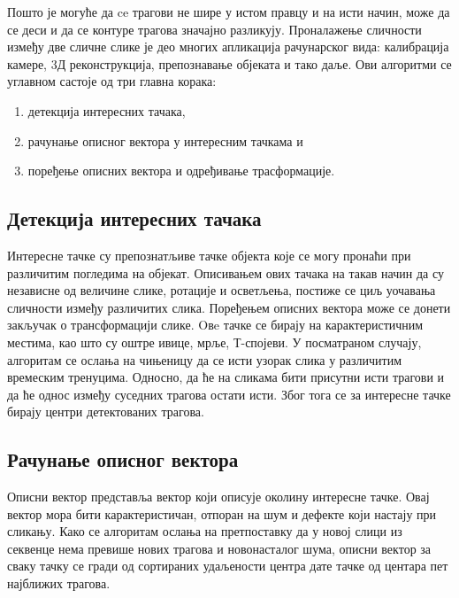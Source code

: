 \documentclass[11pt,a4paper,serbian,oneside]{book}
\begin{document}
Пошто је могуће да ce трагови не шире у истом правцу и на исти начин, може да се деси и да се контуре трагова значајно разликују. Проналажење сличности између две сличне слике је део многих апликација рачунарског вида: калибрација камере, 3Д реконструкција, препознавање објеката и тако даље. Ови алгоритми се  углавном састоје од три главна корака:
\begin{enumerate}
  \item детекција интересних тачака,
  \item рачунање описног вектора у интересним тачкама и
  \item поређење описних вектора и одређивање трасформације.
\end{enumerate}

\subsection{Детекција интересних тачака}
Интересне тачке су препознатљиве тачке објекта које се могу пронаћи при различитим погледима на објекат. Описивањем ових тачака на такав начин да су независне од величине слике, ротације и осветљења, постиже се циљ уочавања сличности између различитих слика. Поређењем описних вектора може се донети закључак о трансформацији слике. Oвe тачке  се бирају на карактеристичним местима, као што су оштре ивице, мрље, Т-спојеви. 
У посматраном случају, алгоритам се ослања на чињеницу да се исти узорак слика у различитим времеским тренуцима. Односно, да ће на сликама бити присутни исти трагови и да ће однос између суседних трагова остати исти. Због тога се за интересне тачке бирају центри детектованих трагова.

\subsection{Рачунање описног вектора}

Описни вектор представља вектор који описује околину интересне тачке. Овај вектор мора бити карактеристичан, отпоран на шум и дефекте који настају при сликању. Како се алгоритам ослања на претпоставку да у новој слици из секвенце нема превише нових трагова и новонасталог шума, описни вектор за сваку тачку се гради од сортираних удаљености центра дате тачке од центара пет најближих трагова.
\end{document}
